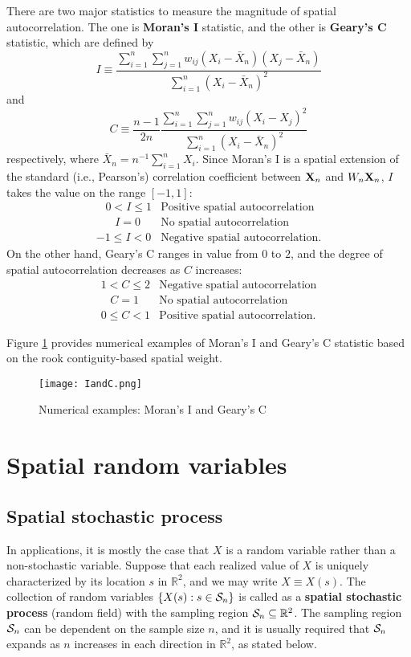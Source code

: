 \documentclass[11pt, A4paper, openany, uplatex]{book}
\begin{document}
There are two major statistics to measure the magnitude of spatial autocorrelation.
The one is \textbf{Moran's I} statistic, and the other is \textbf{Geary's C} statistic, which are defined by
\[
	I \equiv \frac{\sum_{i=1}^n \sum_{j = 1}^n w_{ij}(X_i - \bar{X}_n) (X_j - \bar{X}_n)}{\sum_{i=1}^n (X_i - \bar{X}_n)^2}
\]
and
\[
	C \equiv \frac{n - 1}{2 n} \frac{\sum_{i=1}^n \sum_{j = 1}^n w_{ij}(X_i - X_j )^2}{\sum_{i=1}^n (X_i - \bar{X}_n)^2}
\]
respectively, where $\bar X_n = n^{-1}\sum_{i=1}^n X_i$.
Since Moran's I is a spatial extension of the standard (i.e., Pearson's) correlation coefficient between $\mathbf{X}_n$ and $W_n \mathbf{X}_n$, $I$ takes the value on the range $[-1, 1]$:
\[
\begin{array}{ll}
	\;\;\;0 < I \le 1 & \text{Positive spatial autocorrelation} \\
	\;\;\;\;\;\; I = 0 & \text{No spatial autocorrelation} \\
	-1 \leq I < 0 & \text{Negative spatial autocorrelation.}
\end{array}
\]
On the other hand, Geary's C ranges in value from $0$ to $2$, and the degree of spatial autocorrelation decreases as $C$ increases:
\[
\begin{array}{lc}
	1 < C \le 2 & \text{Negative spatial autocorrelation} \\
	\;\;\; C = 1 & \text{No spatial autocorrelation} \\
	0 \leq C < 1 & \text{Positive spatial autocorrelation.}
\end{array}
\]

Figure \ref{fig:IandC} provides numerical examples of Moran's I and Geary's C statistic based on the rook contiguity-based spatial weight.
\begin{figure}[h!]
	\begin{center}
		\texttt{[image: IandC.png]}
		\caption{Numerical examples: Moran's I and Geary's C\label{fig:IandC}}
	\end{center}
\end{figure}

\section{Spatial random variables}
\subsection{Spatial stochastic process}
In applications, it is mostly the case that $X$ is a random variable rather than a non-stochastic variable.
Suppose that each realized value of $X$ is uniquely characterized by its location $s$ in $\mathbb{R}^2$, and we may write $X \equiv X(s)$.
The collection of random variables $\{X(s) : s \in \mathcal{S}_n\}$ is called as a \textbf{spatial stochastic process} (random field) with the sampling region $\mathcal{S}_n \subseteq \mathbb{R}^2$.
The sampling region $\mathcal{S}_n$ can be dependent on the sample size $n$, and it is usually required that $\mathcal{S}_n$ expands as $n$ increases in each direction in $\mathbb{R}^2$, as stated below.
\end{document}
